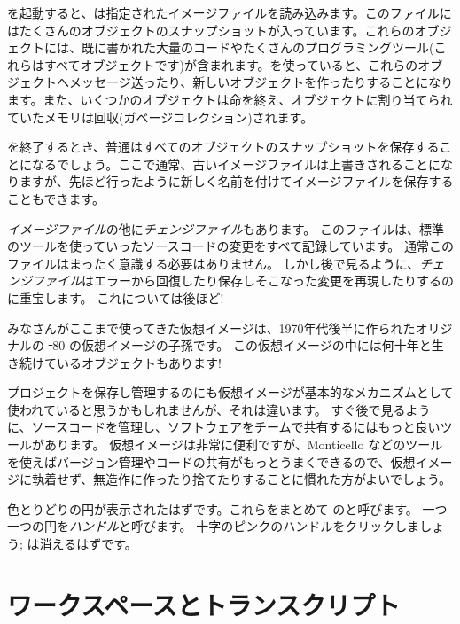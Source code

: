 \documentclass[a4paper,10pt,twoside]{book}
\begin{document}
\pharo を起動すると、\pharo {}は指定されたイメージファイルを読み込みます。このファイルにはたくさんのオブジェクトのスナップショットが入っています。これらのオブジェクトには、既に書かれた大量のコードやたくさんのプログラミングツール(これらはすべてオブジェクトです)が含まれます。\pharo を使っていると、これらのオブジェクトへメッセージ送ったり、新しいオブジェクトを作ったりすることになります。また、いくつかのオブジェクトは命を終え、オブジェクトに割り当てられていたメモリは回収(\ie ガベージコレクション)されます。

\pharo を終了するとき、普通はすべてのオブジェクトのスナップショットを保存することになるでしょう。ここで通常、古いイメージファイルは上書きされることになりますが、先ほど行ったように新しく名前を付けてイメージファイルを保存することもできます。

\emph{イメージファイル}の他に\emph{チェンジファイル}もあります。
このファイルは、標準のツールを使っていったソースコードの変更をすべて記録しています。
通常このファイルはまったく意識する必要はありません。
しかし後で見るように、\emph{チェンジファイル}はエラーから回復したり保存しそこなった変更を再現したりするのに重宝します。
これについては後ほど!

みなさんがここまで使ってきた仮想イメージは、1970年代後半に作られたオリジナルの \st-80 の仮想イメージの子孫です。
この仮想イメージの中には何十年と生き続けているオブジェクトもあります!

プロジェクトを保存し管理するのにも仮想イメージが基本的なメカニズムとして使われていると思うかもしれませんが、それは違います。
すぐ後で見るように、ソースコードを管理し、ソフトウェアをチームで共有するにはもっと良いツールがあります。
仮想イメージは非常に便利ですが、Monticello などのツールを使えばバージョン管理やコードの共有がもっとうまくできるので、仮想イメージに執着せず、無造作に作ったり捨てたりすることに慣れた方がよいでしょう。

色とりどりの円が表示されたはずです。これらをまとめて \bam のと呼びます。
一つ一つの円を\emph{ハンドル}と呼びます。
十字のピンクのハンドルをクリックしましょう; \bam は消えるはずです。

\section{ワークスペースとトランスクリプト}
\end{document}
